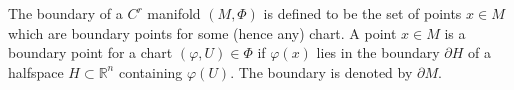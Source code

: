 The boundary of a $C^r$ manifold $(M, \Phi)$ is defined to be the set of points $x \in M$ which are boundary points for some (hence any) chart. A point $x \in M$ is a boundary point for a chart $(\varphi, U) \in \Phi$ if $\varphi(x)$ lies in the boundary $\partial H$ of a halfspace $H \subset \mathbb{R}^n$ containing $\varphi(U)$. The boundary is denoted by $\partial M$.
